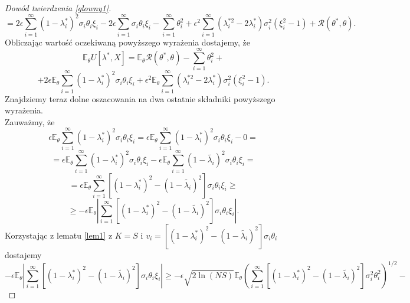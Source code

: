 \documentclass{article}
\begin{document}
\begin{proof}[Dowód twierdzenia \ref{glowny1}]
\begin{displaymath}
\end{displaymath}
\begin{displaymath}
=2\epsilon\sum_{i=1}^{\infty}(1-\lambda_i^*)^2\sigma_i\theta_i\xi_i-2\epsilon\sum_{i=1}^{\infty}\sigma_i\theta_i\xi_i-\sum_{i=1}^{\infty}\theta_i^2+\epsilon^2\sum_{i=1}^{\infty}(\lambda_i^{*2}-2\lambda_i^*)\sigma_i^2(\xi_i^2-1)+\mathcal{R}(\theta^*,\theta).
\end{displaymath}
Obliczając wartość oczekiwaną powyższego wyrażenia dostajemy, że
\begin{equation}\label{ryzyko}
\mathbb{E}_{\theta}U[\lambda^*,X]=\mathbb{E}_{\theta}\mathcal{R}(\theta^*,\theta)-\sum_{i=1}^{\infty}\theta_i^2+
\end{equation}
\begin{displaymath}
+2\epsilon\mathbb{E}_{\theta}\sum_{i=1}^{\infty}(1-\lambda_i^*)^2\sigma_i\theta_i\xi_i+\epsilon^2\mathbb{E}_{\theta}\sum_{i=1}^{\infty}(\lambda_i^{*2}-2\lambda_i^*)\sigma_i^2(\xi_i^2-1).
\end{displaymath}
Znajdziemy teraz dolne oszacowania na dwa ostatnie składniki powyższego wyrażenia.\\
Zauważmy, że 
\begin{displaymath}
\epsilon\mathbb{E}_{\theta}\sum_{i=1}^{\infty}(1-\lambda_i^*)^2\sigma_i\theta_i\xi_i=\epsilon\mathbb{E}_{\theta}\sum_{i=1}^{\infty}(1-\lambda_i^*)^2\sigma_i\theta_i\xi_i-0=
\end{displaymath}
\begin{displaymath}
=\epsilon\mathbb{E}_{\theta}\sum_{i=1}^{\infty}(1-\lambda_i^*)^2\sigma_i\theta_i\xi_i-\epsilon\mathbb{E}_{\theta}\sum_{i=1}^{\infty}(1-\tilde{\lambda_i})^2\sigma_i\theta_i\xi_i=
\end{displaymath}
\begin{displaymath}
=\epsilon\mathbb{E}_{\theta}\sum_{i=1}^{\infty}[(1-\lambda_i^*)^2-(1-\tilde{\lambda_i})^2]\sigma_i\theta_i\xi_i\geq
\end{displaymath}
\begin{displaymath}
\geq -\epsilon\mathbb{E}_{\theta}\left|\sum_{i=1}^{\infty}[(1-\lambda_i^*)^2-(1-\tilde{\lambda_i})^2]\sigma_i\theta_i\xi_i\right|.
\end{displaymath}
Korzystając z lematu \ref{lem1} z $K=S$ i $v_i=[(1-\lambda_i^*)^2-(1-\tilde{\lambda_i})^2]\sigma_i\theta_i$ dostajemy
\begin{displaymath}
-\epsilon\mathbb{E}_{\theta}\left|\sum_{i=1}^{\infty}[(1-\lambda_i^*)^2-(1-\tilde{\lambda_i})^2]\sigma_i\theta_i\xi_i\right|\geq -\epsilon\sqrt{2\ln (NS)}\mathbb{E}_{\theta}\left(\sum_{i=1}^{\infty}[(1-\lambda_i^*)^2-(1-\tilde{\lambda_i})^2]\sigma_i^2\theta_i^2\right)^{1/2}-

\end{displaymath}
\end{proof}
\end{document}

